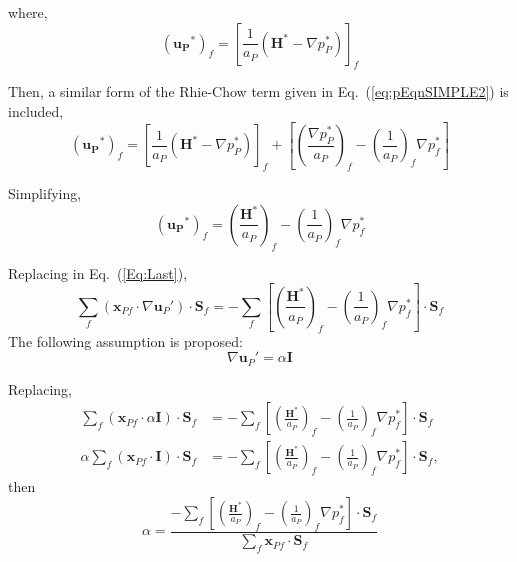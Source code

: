 \documentclass[final,3p,times,10pt,onecolumn]{myElsarticle}
\numberwithin{equation}{section}
\begin{document}
where,
\begin{equation}
\left(
\boldsymbol{u_P}^{*}
\right)_{f}
=
\left[\frac{1}{a_P}\left(\boldsymbol{H}^* - \nabla p_P^{*}\right)\right]_f
\end{equation}

Then, a similar form of the Rhie-Chow term given in Eq.~(\ref{eq:pEqnSIMPLE2}) is included,
\begin{equation}
\left(
\boldsymbol{u_P}^{*}
\right)_{f}
=
\left[\frac{1}{a_P}\left(\boldsymbol{H}^* - \nabla p_P^{*}\right)\right]_f
+
\left[
\left(
\frac{\nabla p_P^{*}}{a_P}
\right)_f
- 
\left(
\frac{1}{a_P}
\right)_f 
\nabla p_f^{*} 
\right]
\end{equation}

Simplifying, 
\begin{equation}
\left(
\boldsymbol{u_P}^{*}
\right)_{f}
=
 \left(\frac{\boldsymbol{H}^*}{a_P}\right)_f 
 -
 \left(\frac{1}{a_P}\right)_f \nabla p_f^{*}
\end{equation}

Replacing in Eq.~(\ref{Eq:Last}),
\begin{equation}
\sum_f 
\left(
\boldsymbol{x}_{Pf}
\cdot 
\nabla \boldsymbol{u}_P'
\right)
\cdot 
\boldsymbol{S}_f
=
-\sum_f
\left[
\left(\frac{\boldsymbol{H}^*}{a_P}\right)_f 
 -
 \left(\frac{1}{a_P}\right)_f \nabla p_f^{*}
 \right]
\cdot 
\boldsymbol{S}_f
\end{equation}
The following assumption is proposed:
\begin{equation}
\nabla \boldsymbol{u}_P'
=
\alpha
\boldsymbol{I}
\end{equation}

Replacing,
\begin{align}
\sum_f 
\left(
\boldsymbol{x}_{Pf}
\cdot 
\alpha
\boldsymbol{I}
\right)
\cdot 
\boldsymbol{S}_f
&=
-\sum_f
\left[
\left(\frac{\boldsymbol{H}^*}{a_P}\right)_f 
 -
 \left(\frac{1}{a_P}\right)_f \nabla p_f^{*}
 \right]
\cdot 
\boldsymbol{S}_f
\\
\alpha
\sum_f 
\left(
\boldsymbol{x}_{Pf}
\cdot 
\boldsymbol{I}
\right)
\cdot 
\boldsymbol{S}_f
&=
-\sum_f
\left[
\left(\frac{\boldsymbol{H}^*}{a_P}\right)_f 
 -
 \left(\frac{1}{a_P}\right)_f \nabla p_f^{*}
 \right]
\cdot 
\boldsymbol{S}_f,
\end{align}
then
\begin{equation}
\alpha
=
\dfrac
{-\sum_f
\left[
\left(\frac{\boldsymbol{H}^*}{a_P}\right)_f 
 -
 \left(\frac{1}{a_P}\right)_f \nabla p_f^{*}
 \right]
\cdot 
\boldsymbol{S}_f}
{\sum_f 
\boldsymbol{x}_{Pf}
\cdot 
\boldsymbol{S}_f}
\end{equation}
\end{document}
